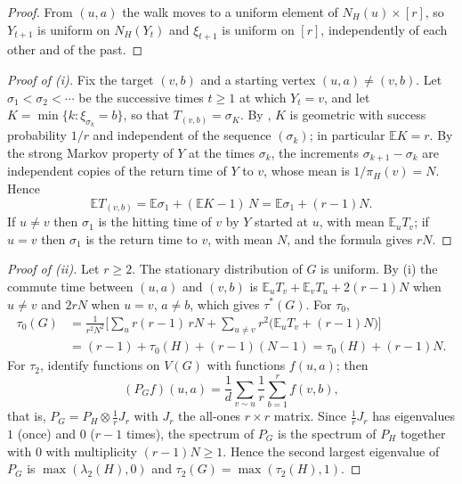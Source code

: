 \documentclass[11pt]{amsart}
\theoremstyle{definition}
\newcommand{\E}{\mathbb{E}}
\begin{document}
\begin{proof}
From $(u,a)$ the walk moves to a uniform element of $N_H(u)\times[r]$, so $Y_{t+1}$ is uniform on $N_H(Y_t)$ and $\xi_{t+1}$ is uniform on $[r]$, independently of each other and of the past.
\end{proof}

\begin{proof}[Proof of (i)]
Fix the target $(v,b)$ and a starting vertex $(u,a)\ne(v,b)$. Let $\sigma_1<\sigma_2<\cdots$ be the successive times $t\ge1$ at which $Y_t=v$, and let $K=\min\{k:\xi_{\sigma_k}=b\}$, so that $T_{(v,b)}=\sigma_K$. By , $K$ is geometric with success probability $1/r$ and independent of the sequence $(\sigma_k)$; in particular $\E K=r$. By the strong Markov property of $Y$ at the times $\sigma_k$, the increments $\sigma_{k+1}-\sigma_k$ are independent copies of the return time of $Y$ to $v$, whose mean is $1/\pi_H(v)=N$. Hence
\[
\E T_{(v,b)}=\E\sigma_1+(\E K-1)\,N=\E\sigma_1+(r-1)N .
\]
If $u\ne v$ then $\sigma_1$ is the hitting time of $v$ by $Y$ started at $u$, with mean $\E_uT_v$; if $u=v$ then $\sigma_1$ is the return time to $v$, with mean $N$, and the formula gives $rN$.
\end{proof}

\begin{proof}[Proof of (ii)]
Let $r\ge2$. The stationary distribution of $G$ is uniform. By (i) the commute time between $(u,a)$ and $(v,b)$ is $\E_uT_v+\E_vT_u+2(r-1)N$ when $u\ne v$ and $2rN$ when $u=v$, $a\ne b$, which gives $\tau^*(G)$. For $\tau_0$,
\begin{align*}
\tau_0(G)&=\frac1{r^2N^2}\Big[\sum_u r(r-1)\,rN+\sum_{u\ne v}r^2\big(\E_uT_v+(r-1)N\big)\Big]\\
&=(r-1)+\tau_0(H)+(r-1)(N-1)=\tau_0(H)+(r-1)N .
\end{align*}
For $\tau_2$, identify functions on $V(G)$ with functions $f(u,a)$; then
\[
(P_Gf)(u,a)=\frac1{d}\sum_{v\sim u}\frac1r\sum_{b=1}^rf(v,b),
\]
that is, $P_G=P_H\otimes\frac1rJ_r$ with $J_r$ the all-ones $r\times r$ matrix. Since $\frac1rJ_r$ has eigenvalues $1$ (once) and $0$ ($r-1$ times), the spectrum of $P_G$ is the spectrum of $P_H$ together with $0$ with multiplicity $(r-1)N\ge1$. Hence the second largest eigenvalue of $P_G$ is $\max(\lambda_2(H),0)$ and $\tau_2(G)=\max(\tau_2(H),1)$.
\end{proof}
\end{document}
